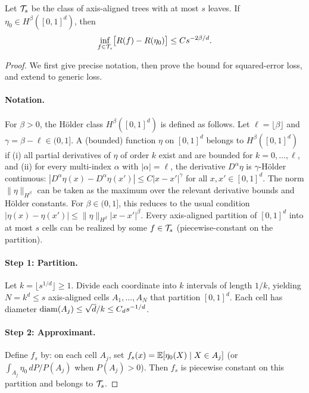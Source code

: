 \documentclass[12pt]{article}
\begin{document}
\begin{lemma}
\label{lem:approx}
Let $\mathcal{T}_s$ be the class of axis-aligned trees with at most $s$ leaves. If $\eta_0 \in H^\beta([0,1]^d)$, then
\[
\inf_{f \in \mathcal{T}_s} \bigl[ R(f) - R(\eta_0) \bigr] \le C s^{-2\beta/d}.
\]
\end{lemma}
\begin{proof}
We first give precise notation, then prove the bound for squared-error loss, and extend to generic loss.

\paragraph{Notation.}
For $\beta > 0$, the H\"older class $H^\beta([0,1]^d)$ is defined as follows. Let $\ell = \lfloor \beta \rfloor$ and $\gamma = \beta - \ell \in (0,1]$. A (bounded) function $\eta$ on $[0,1]^d$ belongs to $H^\beta([0,1]^d)$ if (i) all partial derivatives of $\eta$ of order $k$ exist and are bounded for $k = 0, \ldots, \ell$, and (ii) for every multi-index $\alpha$ with $|\alpha| = \ell$, the derivative $D^\alpha \eta$ is $\gamma$-H\"older continuous: $|D^\alpha \eta(x) - D^\alpha \eta(x')| \le C |x - x'|^\gamma$ for all $x, x' \in [0,1]^d$. The norm $\|\eta\|_{H^\beta}$ can be taken as the maximum over the relevant derivative bounds and H\"older constants. For $\beta \in (0,1]$, this reduces to the usual condition $|\eta(x) - \eta(x')| \le \|\eta\|_{H^\beta} |x - x'|^\beta$. Every axis-aligned partition of $[0,1]^d$ into at most $s$ cells can be realized by some $f \in \mathcal{T}_s$ (piecewise-constant on the partition).

\paragraph{Step 1: Partition.}
Let $k = \lfloor s^{1/d} \rfloor \ge 1$. Divide each coordinate into $k$ intervals of length $1/k$, yielding $N = k^d \le s$ axis-aligned cells $A_1, \ldots, A_N$ that partition $[0,1]^d$. Each cell has diameter $\mathrm{diam}(A_j) \le \sqrt{d}/k \le C_d s^{-1/d}$.

\paragraph{Step 2: Approximant.}
Define $f_s$ by: on each cell $A_j$, set $f_s(x) = \mathbb{E}[\eta_0(X) \mid X \in A_j]$ (or $\int_{A_j} \eta_0 \, dP / P(A_j)$ when $P(A_j) > 0$). Then $f_s$ is piecewise constant on this partition and belongs to $\mathcal{T}_s$.


\end{proof}
\end{document}
